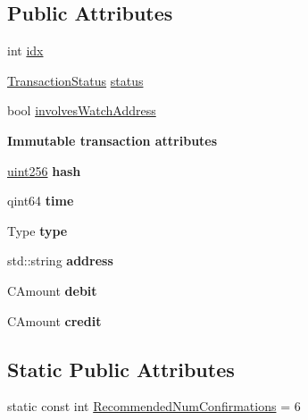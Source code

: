 \subsection*{Public Attributes}
\begin{DoxyCompactItemize}
\item 
int \mbox{\hyperlink{class_transaction_record_a143da419e3dc0bc2ec73e22b3a56d1c9}{idx}}
\item 
\mbox{\hyperlink{class_transaction_status}{Transaction\+Status}} \mbox{\hyperlink{class_transaction_record_a50342213092284a9994f2903991134c0}{status}}
\item 
bool \mbox{\hyperlink{class_transaction_record_ac938161128e04ca5d044d8a19827b0e2}{involves\+Watch\+Address}}
\end{DoxyCompactItemize}
\begin{Indent}\textbf{ Immutable transaction attributes}\par
\begin{DoxyCompactItemize}
\item 
\mbox{\label{class_transaction_record_a7a89b1316eb6e7c14be17cb8448ae586}} 
\mbox{\hyperlink{classuint256}{uint256}} {\bfseries hash}
\item 
\mbox{\label{class_transaction_record_afd105941a1ce3788f86573d17e999a8e}} 
qint64 {\bfseries time}
\item 
\mbox{\label{class_transaction_record_a6a68c861c3f1f10971fa11d8fc7c46e1}} 
Type {\bfseries type}
\item 
\mbox{\label{class_transaction_record_ad8d3d2765f95a40afc6cd93d4a881a38}} 
std\+::string {\bfseries address}
\item 
\mbox{\label{class_transaction_record_a536fdaa56c7f7fb789f064cc475d30c1}} 
C\+Amount {\bfseries debit}
\item 
\mbox{\label{class_transaction_record_aea9d8e5ead391ada02422cef6f45d9c7}} 
C\+Amount {\bfseries credit}
\end{DoxyCompactItemize}
\end{Indent}
\subsection*{Static Public Attributes}
\begin{DoxyCompactItemize}
\item 
static const int \mbox{\hyperlink{class_transaction_record_a1cdf534b1ab2495c839f87beb053eaf8}{Recommended\+Num\+Confirmations}} = 6
\end{DoxyCompactItemize}


